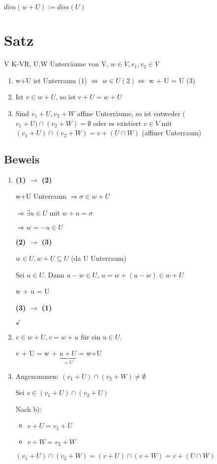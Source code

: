 \documentclass[a4paper, openany]{book}
\begin{document}
    $dim(w+U) := dim(U)$

    \section{Satz}

    V K-VR, U,W Unterräume von V, $w \in V, v_1, v_2 \in V$

    \begin{enumerate}[label=(\alph*)]
      \item w+U ist Unterraum (1) $\Leftrightarrow$ $w \in U  (2) \Leftrightarrow$ w + U = U (3)

      \item Ist $v \in w+U$, so ist $v + U = w + U$

      \item Sind $v_1 + U, v_2 + W$ affine Unterräume, so ist entweder ($v_1 + U) \cap (v_2 + W) = \emptyset$ oder es existiert $v \in V$ mit $(v_1+U) \cap (v_2 + W) = v + (U \cap W)$ (affiner Unterraum)
    \end{enumerate}

    \subsection{Beweis}

    \begin{enumerate}[label=(\alph*)]
      \item  \textbf{(1) $\rightarrow$ (2)}

      w+U Unterraum $\Rightarrow \sigma \in w + U$

      $\Rightarrow \exists u \in U$ mit $w+u = \sigma$ 

      $\Rightarrow w = -u \in U$

      \textbf{(2) $\rightarrow$ (3)}

      $w \in U, w+U \subseteq U$ (da U Unterraum)

      Sei $u \in U$. Dann $u-w \in U$, $u = w + (u-w) \in w + U$

      w + u = U

      \textbf{(3) $\rightarrow$ (1)}

      $\checkmark$

      \item $v \in w+U, v = w+u$ für ein $u \in U$.

      v + U = w + $\underbrace{u + U}_{=U}$ = w+U

      \item Angenommen: $(v_1 + U) \cap (v_2 + W) \neq \emptyset$

      Sei $v \in (v_1+U) \cap (v_2+U)$

      \par \medskip

      Nach b): 

      \begin{itemize}
        \item $v + U = v_1 + U$         
        \item $v + W = v_2 + W$
      \end{itemize}

      $(v_1 + U) \cap (v_2 + W) = (v+ U) \cap (v + W) = v+ (U \cap W)$ 
    \end{enumerate}
\end{document}
